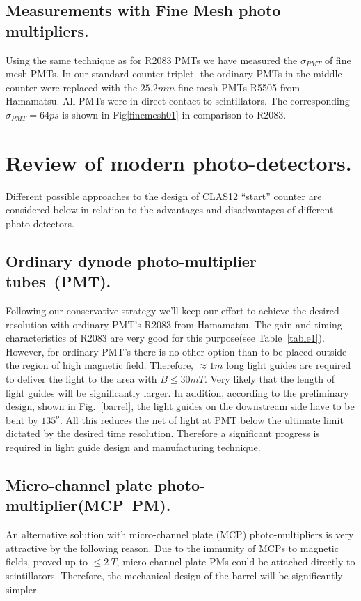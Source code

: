 \subsection{Measurements with Fine Mesh photo multipliers.}

Using the same technique  as for R2083 PMTs we have measured\cite{kuznetsov} the $\sigma_{PMT}$
of  fine mesh PMTs. In our standard counter  triplet\cite{Baturin:2005}-\cite{llg} the  ordinary PMTs in the middle counter were 
replaced with the $25.2 mm$ fine mesh PMTs R5505 from Hamamatsu.
All PMTs were in direct contact to scintillators.
The corresponding  $\sigma_{PMT}=64ps$ is shown in Fig\ref{finemesh01} in comparison to R2083.


\pagebreak
\newpage




\section{Review of modern  photo-detectors.}
\label{phdrev}
Different possible approaches to the design of CLAS12 ``start'' counter are considered below in relation to
the advantages and disadvantages of different photo-detectors. 



\subsection{Ordinary dynode photo-multiplier tubes~(PMT).}

Following our conservative strategy 
 we'll  keep our effort to achieve the desired 
resolution with ordinary PMT's R2083 from Hamamatsu.
The gain and  timing characteristics of R2083 are 
very good for this  purpose(see Table~\ref{table1}).
However, for  ordinary  PMT's there is no other option 
than to be placed  outside  the  region of high magnetic field.
Therefore, $\approx 1m$ long light guides are required to 
deliver the light to the area with $B\le30mT$. 
Very likely that the length of  light guides will be 
significantly larger.
In addition, according to the preliminary 
design, shown in Fig.~\ref{barrel}, 
the light guides on the downstream side have to be bent by $135^o$.
All this reduces the net of light at PMT  
below  the ultimate limit dictated by the desired time resolution.
Therefore a 
significant progress is required in light guide design and manufacturing technique.


\subsection{Micro-channel plate photo-multiplier(MCP~PM).}
An alternative solution  with
micro-channel plate (MCP) photo-multipliers is very attractive
 by the following reason.
Due to  the   immunity of MCPs to 
 magnetic fields, proved  up to $\leq 2~T$\cite{kich}, 
micro-channel plate PMs could be attached directly to scintillators. 
Therefore, the mechanical design of 
the barrel will be  significantly simpler.


